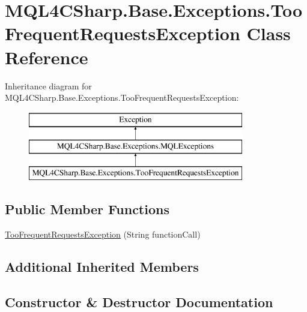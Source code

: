 \hypertarget{class_m_q_l4_c_sharp_1_1_base_1_1_exceptions_1_1_too_frequent_requests_exception}{}\section{M\+Q\+L4\+C\+Sharp.\+Base.\+Exceptions.\+Too\+Frequent\+Requests\+Exception Class Reference}
\label{class_m_q_l4_c_sharp_1_1_base_1_1_exceptions_1_1_too_frequent_requests_exception}
Inheritance diagram for M\+Q\+L4\+C\+Sharp.\+Base.\+Exceptions.\+Too\+Frequent\+Requests\+Exception\+:\begin{figure}[H]
\begin{center}
\leavevmode
\includegraphics[height=3.000000cm]{class_m_q_l4_c_sharp_1_1_base_1_1_exceptions_1_1_too_frequent_requests_exception}
\end{center}
\end{figure}
\subsection*{Public Member Functions}
\begin{DoxyCompactItemize}
\item 
\hyperlink{class_m_q_l4_c_sharp_1_1_base_1_1_exceptions_1_1_too_frequent_requests_exception_a173c6a9d3ede27fd48f4d420f2d80fff}{Too\+Frequent\+Requests\+Exception} (String function\+Call)
\end{DoxyCompactItemize}
\subsection*{Additional Inherited Members}


\subsection{Constructor \& Destructor Documentation}
